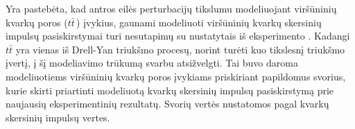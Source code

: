 \documentclass[a4paper, 12pt]{article}
\begin{document}
\vspace{-0.9cm}
\vspace{0.5cm}


Yra pastebėta, kad antros eilės perturbacijų tikslumu modeliuojant viršūninių kvarkų poros ($t\bar{t}\,$)
įvykius, gaunami modeliuoti viršūninių kvarkų skersinių impulsų pasiskirstymai turi nesutapimų su nustatytais
iš eksperimento \cite{ttbarPT}.
Kadangi $t\bar{t}$ yra vienas iš Drell-Yan triukšmo procesų, norint turėti kuo tikslesnį triukšmo įvertį, į šį
modeliavimo trūkumą svarbu atsižvelgti.
Tai buvo daroma modeliuotiems viršūninių kvarkų poros įvykiams priskiriant papildomus svorius, kurie skirti
priartinti modeliuotą kvarkų skersinių impulsų pasiskirstymą prie naujausių eksperimentinių rezultatų.
Svorių vertės nustatomos pagal kvarkų skersinių impulsų vertes.
\end{document}
